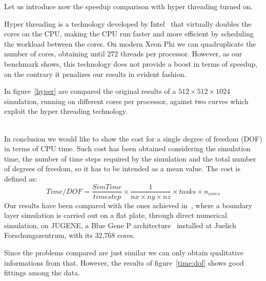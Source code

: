 Let us introduce now the speedup comparison with hyper threading turned on. \par
Hyper threading is a technology developed by Intel~\cite{hyper:paper}  that virtually doubles the cores on the CPU, making the CPU run faster and more efficient by scheduling the workload between the cores. On modern Xeon Phi we can quadruplicate the number of cores, obtaining until 272 threads per processor. However, as our benchmark shows, this technology does not provide a boost in terms of speedup, on the contrary it penalizes our results in evident fashion.\par
In figure~\ref{hyper} are compared the original results of a $512\times 512\times 1024$ simulation, running on different cores per processor, against two curves which exploit the hyper threading technology.\\~\par
In conclusion we would like to show the cost for a single degree of freedom (DOF) in terms of CPU time.
Such cost has been obtained considering the simulation time, the number of time steps required by the simulation and the total number of degrees of freedom, so it has to be intended as a mean value.
The cost is defined as:
\begin{equation}
Time/DOF = \frac{Sim Time}{timestep}\times \frac{1}{nx\times ny\times nz} \times {tasks}\times{n_{cores}}
\end{equation}
Our results have been compared with the ones achieved in~\cite{Borrel}, where a boundary layer simulation is carried out on a flat plate, through direct numerical simulation, on JUGENE, a Blue Gene P architecture~\cite{blue:gene:chip}\cite{blue:gene:network} installed at Juelich Forschungszentrum, with its 32,768 cores.\par
Since the problems compared are just similar we can only obtain qualitative informations from that. However, the results of figure~\ref{time:dof} shows good fittings among the data.


